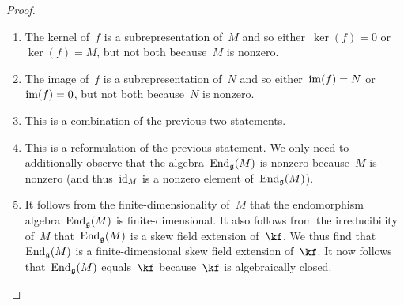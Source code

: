 \begin{proof}
	\leavevmode
	\begin{enumerate}
		\item
			The kernel of~$f$ is a subrepresentation of~$M$ and so either~$\ker(f) = 0$ or~$\ker(f) = M$, but not both because~$M$ is nonzero.
		\item
			The image of~$f$ is a subrepresentation of~$N$ and so either~$\operatorname{im}(f) = N$ or~$\operatorname{im}(f) = 0$, but not both because~$N$ is nonzero.
		\item
			This is a combination of the previous two statements.
		\item
			This is a reformulation of the previous statement.
			We only need to additionally observe that the algebra~$\operatorname{End}_{\mathfrak{g}}(M)$ is nonzero because~$M$ is nonzero (and thus~$\mathrm{id}_M$ is a nonzero element of~$\operatorname{End}_{\mathfrak{g}}(M)$).
		\item
			It follows from the finite-dimensionality of~$M$ that the endomorphism algebra~$\operatorname{End}_{\mathfrak{g}}(M)$ is finite-dimensional.
			It also follows from the irreducibility of~$M$ that~$\operatorname{End}_{\mathfrak{g}}(M)$ is a skew field extension of~$\kf$.
			We thus find that~$\operatorname{End}_{\mathfrak{g}}(M)$ is a finite-dimensional skew field extension of~$\kf$.
			It now follows that~$\operatorname{End}_{\mathfrak{g}}(M)$ equals~$\kf$ because~$\kf$ is algebraically closed.
		\qedhere
	\end{enumerate}
\end{proof}


